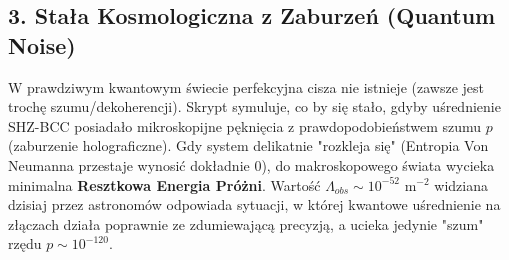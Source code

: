 \documentclass[11pt,a4paper]{article}
\begin{document}
\subsection*{3. Stała Kosmologiczna z Zaburzeń (Quantum Noise)}
W prawdziwym kwantowym świecie perfekcyjna cisza nie istnieje (zawsze jest trochę szumu/dekoherencji). Skrypt symuluje, co by się stało, gdyby uśrednienie SHZ-BCC posiadało mikroskopijne pęknięcia z prawdopodobieństwem szumu $p$ (zaburzenie holograficzne).
Gdy system delikatnie "rozkleja się" (Entropia Von Neumanna przestaje wynosić dokładnie $0$), do makroskopowego świata wycieka minimalna \textbf{Resztkowa Energia Próżni}. Wartość $\Lambda_{obs} \sim 10^{-52} \text{ m}^{-2}$ widziana dzisiaj przez astronomów odpowiada sytuacji, w której kwantowe uśrednienie na złączach działa poprawnie ze zdumiewającą precyzją, a ucieka jedynie "szum" rzędu $p \sim 10^{-120}$.
\end{document}
